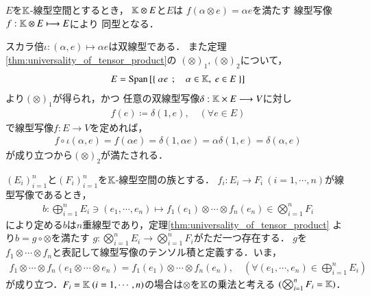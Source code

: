 	\begin{screen}
		\begin{thm}[スカラーとのテンソル積]
			$E$を$\mathbb{K}$-線型空間とするとき，
			$\mathbb{K} \otimes E$と$E$は
			$f(\alpha \otimes e) = \alpha e$を満たす
			線型写像$f:\mathbb{K} \otimes E \longmapsto E$により
			同型となる．
		\end{thm}
	\end{screen}
	
	\begin{prf}
		スカラ倍$\iota:(\alpha, e) \longmapsto \alpha e$は双線型である．
		また定理\ref{thm:universality_of_tensor_product}の
		$(\otimes)_1,(\otimes)_2$について，
		\begin{align}
			E = \mathrm{Span}\left[ \left\{\ \alpha e\ \, ; \quad \alpha \in \mathbb{K},\ e \in E\ \right\} \right]
		\end{align}
		より$(\otimes)_1$が得られ，かつ
		任意の双線型写像$\delta:\mathbb{K} \times E \longrightarrow V$に対し
		\begin{align}
			f(e) \coloneqq \delta(1,e),
			\quad (\forall e \in E)
		\end{align}
		で線型写像$f:E \longrightarrow V$を定めれば，
		\begin{align}
			f \circ \iota (\alpha,e) 
			= f(\alpha e) 
			= \delta(1,\alpha e)
			= \alpha \delta(1,e)
			= \delta (\alpha ,e)
		\end{align}
		が成り立つから$(\otimes)_2$が満たされる．
		\QED
	\end{prf}
	
	\begin{screen}
		\begin{dfn}[線型写像のテンソル積]
				$(E_i)_{i=1}^n$と$(F_i)_{i=1}^n$を$\mathbb{K}$-線型空間の族とする．
				$f_i:E_i \longrightarrow F_i\ (i=1,\cdots,n)$が線型写像であるとき，
				\begin{align}
					b: \bigoplus_{i=1}^n E_i \ni (e_1,\cdots,e_n)
					\longmapsto f_1(e_1)\otimes \cdots \otimes f_n(e_n)
					\in \bigotimes_{i=1}^n F_i
				\end{align}
				により定める$b$は$n$重線型であり，定理\ref{thm:universality_of_tensor_product}
				より$b = g \circ \otimes$を満たす
				$g:\bigotimes_{i=1}^{n} E_i \longrightarrow \bigotimes_{i=1}^{n} F_i$がただ一つ存在する．
				$g$を$f_1 \otimes \cdots \otimes f_n$と表記して線型写像のテンソル積と定義する．いま，
				\begin{align}
					f_1 \otimes \cdots \otimes f_n(e_1 \otimes \cdots \otimes e_n)
					= f_1(e_1)\otimes \cdots \otimes f_n(e_n),
					\quad (\forall (e_1,\cdots,e_n) \in \bigoplus_{i=1}^n E_i)
				\end{align}
				が成り立つ．$F_i = \K\ (i=1,\cdots,n)$の場合は$\otimes$を$\mathbb{K}$の乗法と考える
				$(\bigotimes_{i=1}^n F_i = \mathbb{K})$．
		\end{dfn}
	\end{screen}
	
